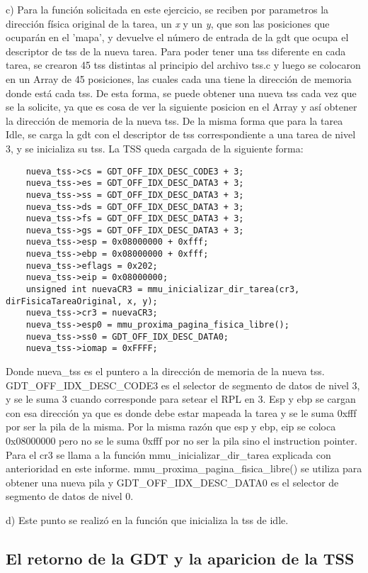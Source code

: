 \documentclass[a4paper]{article}
\begin{document}
c) Para la función solicitada en este ejercicio, se reciben por parametros la dirección física original de la tarea, un \textit{x} y un \textit{y}, que son las posiciones que ocuparán
en el 'mapa', y devuelve el número de entrada de la gdt que ocupa el descriptor de tss de la nueva tarea.
Para poder tener una tss diferente en cada tarea, se crearon 45 tss distintas al principio del archivo tss.c y luego se colocaron en un Array de 45 posiciones, las cuales cada una tiene
la dirección de memoria donde está cada tss. De esta forma, se puede obtener una nueva tss cada vez que se la solicite, ya que es cosa de ver la siguiente posicion en el Array y así obtener la dirección
de memoria de la nueva tss.
De la misma forma que para la tarea Idle, se carga la gdt con el descriptor de tss correspondiente a una tarea de nivel 3, y se inicializa su tss. La TSS queda cargada de la siguiente forma:
\begin{verbatim}
	nueva_tss->cs = GDT_OFF_IDX_DESC_CODE3 + 3;
	nueva_tss->es = GDT_OFF_IDX_DESC_DATA3 + 3;
	nueva_tss->ss = GDT_OFF_IDX_DESC_DATA3 + 3;
	nueva_tss->ds = GDT_OFF_IDX_DESC_DATA3 + 3;
	nueva_tss->fs = GDT_OFF_IDX_DESC_DATA3 + 3;
	nueva_tss->gs = GDT_OFF_IDX_DESC_DATA3 + 3;
	nueva_tss->esp = 0x08000000 + 0xfff;
	nueva_tss->ebp = 0x08000000 + 0xfff;
	nueva_tss->eflags = 0x202;
	nueva_tss->eip = 0x08000000;
	unsigned int nuevaCR3 = mmu_inicializar_dir_tarea(cr3, dirFisicaTareaOriginal, x, y);
	nueva_tss->cr3 = nuevaCR3;
	nueva_tss->esp0 = mmu_proxima_pagina_fisica_libre();
	nueva_tss->ss0 = GDT_OFF_IDX_DESC_DATA0;
	nueva_tss->iomap = 0xFFFF;
\end{verbatim}
Donde nueva_tss es el puntero a la dirección de memoria de la nueva tss. GDT_OFF_IDX_DESC_CODE3 es el selector de segmento de datos de nivel 3, y se le suma 3 cuando corresponde
para setear el RPL en 3. Esp y ebp se cargan con esa dirección ya que es donde debe estar mapeada la tarea y se le suma 0xfff por ser la pila de la misma. Por la misma razón que esp y ebp, eip se coloca 0x08000000
pero no se le suma 0xfff por no ser la pila sino el instruction pointer. Para el cr3 se llama a la función mmu_inicializar_dir_tarea explicada con anterioridad en este informe.
mmu_proxima_pagina_fisica_libre() se utiliza para obtener una nueva pila y GDT_OFF_IDX_DESC_DATA0 es el selector de segmento de datos de nivel 0.

d) Este punto se realizó en la función que inicializa la tss de idle. 



\subsection{El retorno de la GDT y la aparicion de la TSS}
\end{document}
